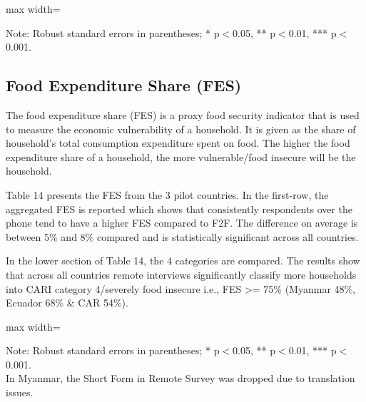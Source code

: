 \documentclass[11pt,harvard]{article}
\begin{document}
\begin{table}[htbp]
	\centering
	\begin{adjustbox}{max width=\textwidth}
		\begin{threeparttable}
			\caption{CAR: Each Coping Strategy Used}
			\scriptsize
			 
			\label{tab:LCS_Ind_Modality_CAR}
			\begin{tablenotes}
				\item Note: Robust standard errors in parentheses; * p$<$0.05, ** p$<$0.01, *** p$<$0.001. 
			\end{tablenotes}
		\end{threeparttable}
	\end{adjustbox}
\end{table}

\pagebreak

\subsection{Food Expenditure Share (FES)}

The food expenditure share (FES) is a proxy food security indicator that is used to measure the economic vulnerability of a household. It is given as the share of household's total consumption expenditure spent on food. The higher the food expenditure share of a household, the more vulnerable/food insecure will be the household.

Table 14 presents the FES from the 3 pilot countries. In the first-row, the aggregated FES is reported which shows that consistently respondents over the phone tend to have a higher FES compared to F2F. The difference on average is between 5\% and 8\% compared and is statistically significant across all countries. 

In the lower section of Table 14, the 4 categories are compared. The results show that across all countries remote interviews significantly classify more households into CARI category 4/severely food insecure i.e., FES >= 75\% (Myanmar 48\%, Ecuador 68\% \& CAR 54\%).

\begin{table}[htbp]
	\centering
	\begin{adjustbox}{max width=\textwidth}
		\begin{threeparttable}
			\caption{Impact of Survey Modality on Expenditure and Food Expenditure Share}
			\scriptsize
			 
			\label{tab:FES_Modality_All_Country}
			\begin{tablenotes}
				\item Note: Robust standard errors in parentheses; * p$<$0.05, ** p$<$0.01, *** p$<$0.001. \\ 
				In Myanmar, the Short Form in Remote Survey was dropped due to translation issues.
			\end{tablenotes}
		\end{threeparttable}
	\end{adjustbox}
\end{table}
\end{document}
